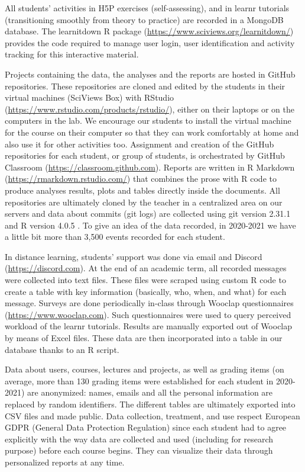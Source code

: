 \documentclass{aims}
\theoremstyle{definition}
\begin{document}
All students' activities in H5P exercises (self-assessing), and in
learnr tutorials (transitioning smoothly from theory to practice) are
recorded in a MongoDB database. The learnitdown R package
(\url{https://www.sciviews.org/learnitdown/}) provides the code required
to manage user login, user identification and activity tracking for this
interactive material.

Projects containing the data, the analyses and the reports are hosted in
GitHub repositories. These repositories are cloned and edited by the
students in their virtual machines (SciViews Box) with RStudio
(\url{https://www.rstudio.com/products/rstudio/}), either on their
laptops or on the computers in the lab. We encourage our students to
install the virtual machine for the course on their computer so that
they can work comfortably at home and also use it for other activities
too. Assignment and creation of the GitHub repositories for each
student, or group of students, is orchestrated by GitHub Classroom
(\url{https://classroom.github.com}). Reports are written in R Markdown
(\url{https://rmarkdown.rstudio.com/}) that combines the prose with R
code to produce analyses results, plots and tables directly inside the
documents. All repositories are ultimately cloned by the teacher in a
centralized area on our servers and data about commits (git logs) are
collected using git version 2.31.1 and R version 4.0.5
\cite{Rcoreteam2021}. To give an idea of the data recorded, in 2020-2021
we have a little bit more than 3,500 events recorded for each student.

In distance learning, students' support was done via email and Discord
(\url{https://discord.com}). At the end of an academic term, all
recorded messages were collected into text files. These files were
scraped using custom R code to create a table with key information
(basically, who, when, and what) for each message. Surveys are done
periodically in-class through Wooclap questionnaires
(\url{https://www.wooclap.com}). Such questionnaires were used to query
perceived workload of the learnr tutorials. Results are manually
exported out of Wooclap by means of Excel files. These data are then
incorporated into a table in our database thanks to an R script.

Data about users, courses, lectures and projects, as well as grading
items (on average, more than 130 grading items were established for each
student in 2020-2021) are anonymized: names, emails and all the personal
information are replaced by random identifiers. The different tables are
ultimately exported into CSV files and made public. Data collection,
treatment, and use respect European GDPR (General Data Protection
Regulation) since each student had to agree explicitly with the way data
are collected and used (including for research purpose) before each
course begins. They can visualize their data through personalized
reports at any time.
\end{document}
